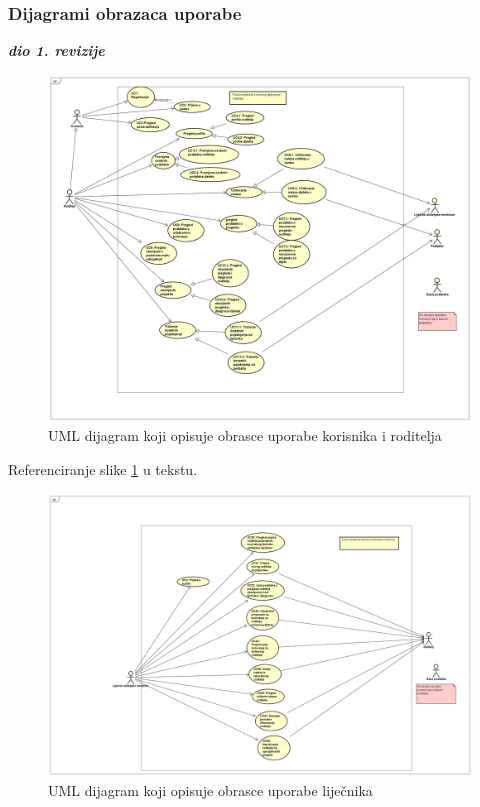 					
				
					
				\subsubsection{Dijagrami obrazaca uporabe}
					\textbf{\textit{dio 1. revizije}}\\
						\begin{figure}[H]
						\includegraphics[width=\textwidth]{slike/UCroditelj.PNG} %
						\caption{UML dijagram koji opisuje obrasce uporabe korisnika i roditelja}
						\label{fig:promjene3} %
					\end{figure}
					
					Referenciranje slike \ref{fig:promjene3} u tekstu.
					
					\begin{figure}[H]
						\includegraphics[width=\textwidth]{slike/UCliječnik.PNG} %
						\caption{UML dijagram koji opisuje obrasce uporabe liječnika}
						\label{fig:promjene4} %
					\end{figure}
					
